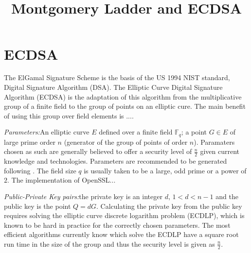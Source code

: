 \documentclass[a4paper, 12pt, envcountsect, runningheads]{article}
\newcommand{\F}{{\mathbb F}}
\numberwithin{figure}{section}
\numberwithin{equation}{section}
\begin{document}
\title{Montgomery Ladder and ECDSA}
\maketitle

\section*{ECDSA}


The ElGamal Signature Scheme is the basis of the US 1994 NIST standard, Digital Signature Algorithm (DSA). The Elliptic Curve Digital Signature Algorithm (ECDSA) is the adaptation of this algorithm from the multiplicative group of a finite field to the group of points on an elliptic cure. The main benefit of using this group over field elements is ....

\emph{Parameters:}\quad An elliptic curve $E$ defined over a finite field $\F_{q}$; a point $G\in E$ of large prime order $n$ (generator of the group of points of order $n$). Paramaters chosen as such are generally believed to offer a security level of $\frac{n}{2}$ given current knowledge and technologies. Parameters are recommended to be generated following \cite{fips}. The field size $q$ is usually taken to be a large, odd prime or a power of $2$. The implementation of OpenSSL...



\emph{Public-Private Key pairs:}\quad the private key is an integer $d$, $1<d<n-1$ and the public key is the point $Q=dG$. Calculating the private key from the public key requires solving the elliptic curve discrete logarithm problem (ECDLP), which is known to be hard in practice for the correctly chosen parameters. The most efficient algorithms currently know which solve the ECDLP have a square root run time in the size of the group and thus the security level is given as $\frac{n}{2}$.
\vspace{0.5cm}
\end{document}

